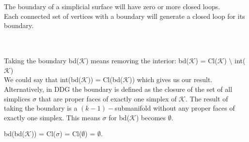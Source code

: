 \documentclass{article}
\begin{document}
\vspace{1.8cm}
\\\\

The boundary of a simplicial surface will have zero or more closed loops.\\
Each connected set of vertices with a boundary will generate a closed loop for its boundary.


\vspace{1.8cm}
\\\\

Taking the boundary bd($\mathcal{K}$) means removing the interior: bd($\mathcal{K}$) = Cl($\mathcal{K}$) $\setminus$ int($\mathcal{K}$)\\
We could say that int(bd($\mathcal{K}$)) = Cl(bd($\mathcal{K}$)) which gives us our result.\\
Alternatively, in DDG the boundary is defined as the closure of the set of all simplices $\sigma$ that are proper faces of exactly one simplex of $\mathcal{K}$. 
The result of taking the boundary is a $(k-1)-$submanifold without any proper faces of exactly one simplex.
This means $\sigma$ for bd($\mathcal{K}$) becomes $\emptyset$.\\
\begin{center}
    bd(bd($\mathcal{K}$)) = Cl($\sigma$) = Cl($\emptyset$) = $\emptyset$.
\end{center}
\end{document}
